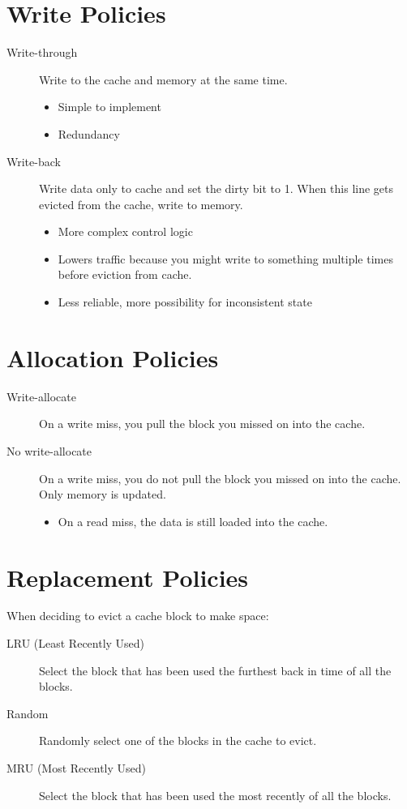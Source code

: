 \section{Write Policies}
\begin{description}
	\item[Write-through] Write to the cache and memory at the same time.
		\begin{itemize}
			\item Simple to implement
			\item Redundancy
		\end{itemize}
	\item[Write-back] Write data only to cache and set the dirty bit to 1. When this line gets evicted from the cache, write to memory.
		\begin{itemize}
			\item More complex control logic
			\item Lowers traffic because you might write to something multiple times before eviction from cache.
			\item Less reliable, more possibility for inconsistent state
		\end{itemize}
\end{description}

\section{Allocation Policies}
\begin{description}
    \item[Write-allocate] On a write miss, you pull the block you missed on into the cache.
    \item[No write-allocate] On a write miss, you do not pull the block you missed on into the cache. Only memory is updated.
    \begin{itemize}
        \item On a read miss, the data is still loaded into the cache.
    \end{itemize}
\end{description}

\section{Replacement Policies}
When deciding to evict a cache block to make space:
\begin{description}
    \item[LRU (Least Recently Used)] Select the block that has been used the furthest back in time of all the blocks.
    \item[Random] Randomly select one of the blocks in the cache to evict.
    \item[MRU (Most Recently Used)] Select the block that has been used the most recently of all the blocks.
\end{description}

